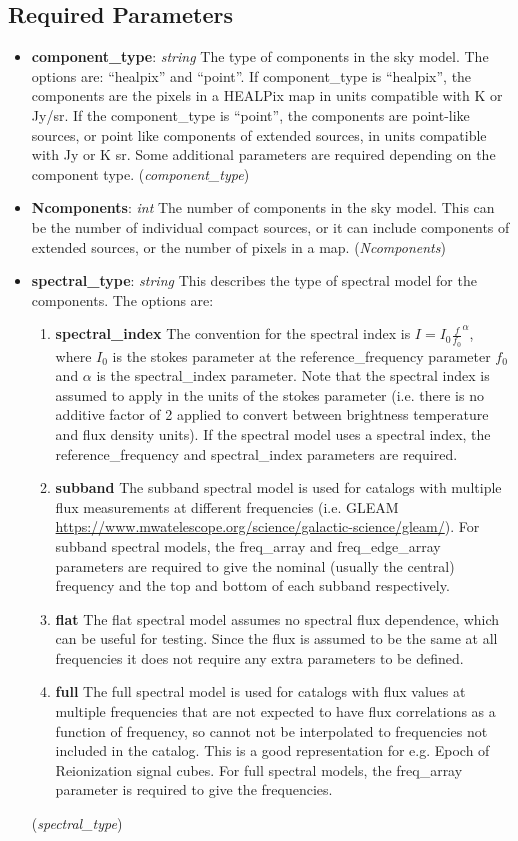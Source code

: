 \documentclass[11pt, oneside]{article}
\begin{document}
\subsection{Required Parameters}
\label{sec:req_params}
\begin{itemize}

\item \textbf{component\_type}: \textit{string} The type of components in the sky model.
The options are: ``healpix'' and ``point''. If component\_type is ``healpix'', the components
are the pixels in a HEALPix map in units compatible with K or Jy/sr. If the
component\_type is ``point'', the components are point-like sources, or point like
components of extended sources, in units compatible with Jy or K sr. Some additional
parameters are required depending on the component type. (\textit{component\_type})

\item \textbf{Ncomponents}: \textit{int} The number of components in the sky model. This
can be the number of individual compact sources, or it can include components of
extended sources, or the number of pixels in a map. (\textit{Ncomponents})

\item \textbf{spectral\_type}: \textit{string} This describes the type of spectral model for
the components. The options are:
\begin{enumerate}
	\item \textbf{spectral\_index} The convention for the spectral index is
	$I=I_0 \frac{f}{f_0}^{\alpha}$, where $I_0$ is the stokes parameter at the
	reference\_frequency parameter $f_0$ and $\alpha$ is the spectral\_index
	parameter. Note that the spectral index is assumed to apply in the units of the
	stokes parameter (i.e. there is no additive factor of 2 applied to convert between
	brightness temperature and flux density units). If the spectral model uses a
	spectral index, the reference\_frequency and spectral\_index parameters are
	required.
	\item \textbf{subband} The subband spectral model is used for catalogs with
	multiple flux measurements at different frequencies (i.e. GLEAM
	\url{https://www.mwatelescope.org/science/galactic-science/gleam/}). For subband
	spectral models, the freq\_array and freq\_edge\_array parameters are required
	to give the nominal (usually the central) frequency and the top and bottom of
	each subband respectively.
	\item \textbf{flat} The flat spectral model assumes no spectral flux dependence,
	which can be useful for testing. Since the flux is assumed to be the same at all
	frequencies it does not require any extra parameters to be defined.
	\item \textbf{full} The full spectral model is used for catalogs with flux values at
	multiple frequencies that are not expected to have flux correlations as a function
	of frequency, so cannot not be interpolated to frequencies not included in the
	catalog. This is a good representation for e.g. Epoch of Reionization signal cubes.
	For full  spectral models, the freq\_array parameter is required to give the frequencies.
\end{enumerate}
(\textit{spectral\_type})


\end{itemize}
\end{document}
